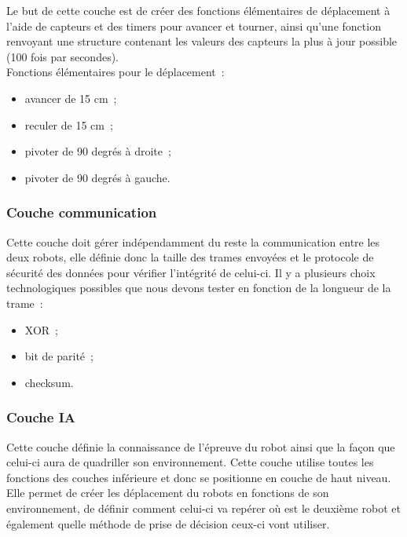 \documentclass{article}
\begin{document}
Le but de cette couche est de créer des fonctions élémentaires de déplacement à l’aide de capteurs et des timers pour avancer et tourner, ainsi qu’une fonction renvoyant une structure contenant les valeurs des capteurs la plus à jour possible (100 fois par secondes). \\

Fonctions élémentaires pour le déplacement~: \\

\begin{itemize}
  \item avancer de 15 cm~;
  \item reculer de 15 cm~;
  \item pivoter de 90 degrés à droite~;
  \item pivoter de 90 degrés à gauche.
\end{itemize}

\subsubsection{Couche communication}

Cette couche doit gérer indépendamment du reste la communication entre les deux robots, elle définie donc la taille des trames envoyées et le protocole de sécurité des données pour vérifier l’intégrité de celui-ci. Il y a plusieurs choix technologiques possibles que nous devons tester en fonction de la longueur de la trame~: \\

\begin{itemize}
  \item XOR~;
  \item bit de parité~;
  \item checksum.
\end{itemize}

\subsubsection{Couche IA}

Cette couche définie la connaissance de l’épreuve du robot ainsi que la façon que celui-ci aura de quadriller son environnement. Cette couche utilise toutes les fonctions des couches inférieure et donc se positionne en couche de haut niveau. Elle permet de créer les déplacement du robots en fonctions de son environnement, de définir comment celui-ci va repérer où est le deuxième robot et également quelle méthode de prise de décision ceux-ci vont utiliser. \\
\end{document}

